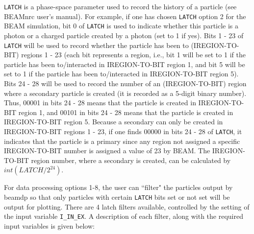 \documentclass[12pt,twoside]{article}
\begin{document}
\noindent
\verb+LATCH+ is a phase-space parameter used to record the history of a
particle (see BEAMnrc user's manual). For example, if one has chosen
\verb+LATCH+ option 2 for the BEAM simulation,  bit 0 of \verb+LATCH+ is
used to indicate whether this particle is a photon or a charged particle
created by a photon (set to 1 if yes). Bits 1 - 23 of \verb+LATCH+ will be
used to record whether the particle has been to (IREGION-TO-BIT) regions 1
- 23 (each bit represents a region, i.e., bit 1 will be set to 1 if the
particle has been to/interacted in IREGION-TO-BIT region 1, and bit 5 will
be set to 1 if the particle has been to/interacted in IREGION-TO-BIT
region 5). Bits 24 - 28 will be used to record the number of an
(IREGION-TO-BIT) region where a secondary particle is created (it is
recorded as a 5-digit binary number). Thus, 00001 in bits 24 - 28 means
that the particle is created in IREGION-TO-BIT region 1, and 00101 in bits
24 - 28 means that the particle is created in IREGION-TO-BIT region 5.
Because a secondary can only be created in IREGION-TO-BIT regions 1 - 23,
if one finds 00000 in bits 24 - 28 of \verb+LATCH+, it indicates that the
particle is  a primary since any region not assigned a specific
IREGION-TO-BIT number is assigned a value of 23 by BEAM.  The
IREGION-TO-BIT region number, where a secondary is created, can be
calculated by $int(LATCH/2^{24})$.


\noindent
For data processing options 1-8, the user can ``filter" the particles output
by beamdp so that only
particles with certain \verb+LATCH+ bits set or not set will be output
for plotting.  There are 4 latch filters available, controlled by the setting
of the input variable {\tt I\_IN\_EX}.  A description of each filter, along
with the required input variables is given below:
\end{document}
